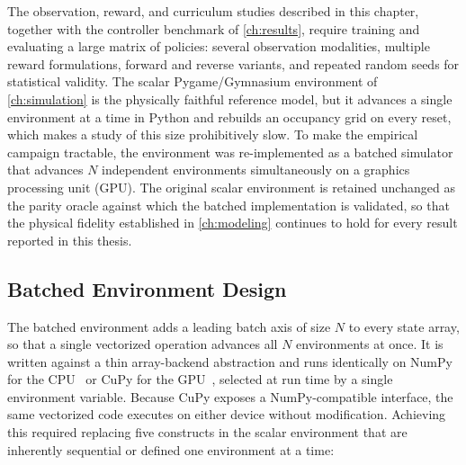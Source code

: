 The observation, reward, and curriculum studies described in this chapter, together with the controller benchmark of \cref{ch:results}, require training and evaluating a large matrix of policies: several observation modalities, multiple reward formulations, forward and reverse variants, and repeated random seeds for statistical validity. The scalar Pygame/Gymnasium environment of \cref{ch:simulation} is the physically faithful reference model, but it advances a single environment at a time in Python and rebuilds an occupancy grid on every reset, which makes a study of this size prohibitively slow. To make the empirical campaign tractable, the environment was re-implemented as a batched simulator that advances $N$ independent environments simultaneously on a graphics processing unit (GPU). The original scalar environment is retained unchanged as the parity oracle against which the batched implementation is validated, so that the physical fidelity established in \cref{ch:modeling} continues to hold for every result reported in this thesis.

\subsection{Batched Environment Design}

The batched environment adds a leading batch axis of size $N$ to every state array, so that a single vectorized operation advances all $N$ environments at once. It is written against a thin array-backend abstraction and runs identically on NumPy for the CPU~\cite{harris2020numpy} or CuPy for the GPU~\cite{okuta2017cupy}, selected at run time by a single environment variable. Because CuPy exposes a NumPy-compatible interface, the same vectorized code executes on either device without modification. Achieving this required replacing five constructs in the scalar environment that are inherently sequential or defined one environment at a time:

